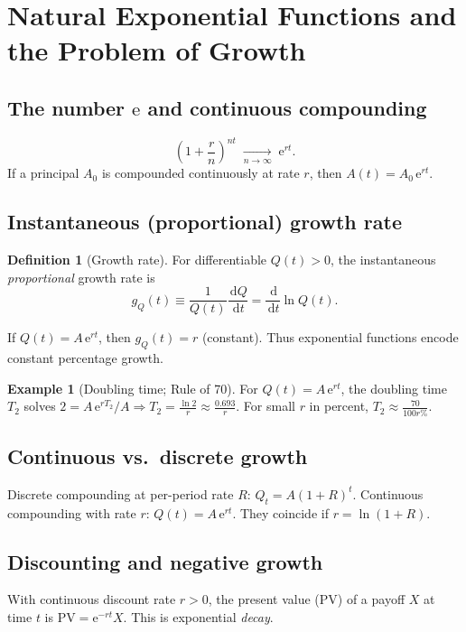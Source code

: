 \documentclass[12pt]{article}
\newcommand{\dd}{\,\mathrm{d}}
\newcommand{\e}{\mathrm{e}}
\newcommand{\1}{\mathbf{1}}
\theoremstyle{definition}
\newtheorem{definition}{Definition}
\newtheorem{example}{Example}
\theoremstyle{plain}
\begin{document}
\section{Natural Exponential Functions and the Problem of Growth}
\subsection*{The number \(\e\) and continuous compounding}
\[
\left(1+\frac{r}{n}\right)^{nt} \;\xrightarrow[n\to\infty]{}\; \e^{rt}.
\]
If a principal \(A_0\) is compounded continuously at rate \(r\), then \(A(t)=A_0\,\e^{rt}\).

\subsection*{Instantaneous (proportional) growth rate}
\begin{definition}[Growth rate]
For differentiable \(Q(t)>0\), the instantaneous \emph{proportional} growth rate is
\[
g_Q(t)\equiv\frac{1}{Q(t)}\frac{\dd Q}{\dd t}=\frac{\dd}{\dd t}\ln Q(t).
\]
\end{definition}
If \(Q(t)=A\,\e^{rt}\), then \(g_Q(t)=r\) (constant). Thus exponential functions encode constant percentage growth.

\begin{example}[Doubling time; Rule of 70]
For \(Q(t)=A\,\e^{rt}\), the doubling time \(T_2\) solves \(2=A\,\e^{rT_2}/A\Rightarrow T_2=\frac{\ln 2}{r}\approx\frac{0.693}{r}\). For small \(r\) in percent, \(T_2\approx\frac{70}{100r\%}\).
\end{example}

\subsection*{Continuous vs.\ discrete growth}
Discrete compounding at per-period rate \(R\): \(Q_t=A(1+R)^t\). Continuous compounding with rate \(r\): \(Q(t)=A\,\e^{rt}\). They coincide if \(r=\ln(1+R)\).

\subsection*{Discounting and negative growth}
With continuous discount rate \(r>0\), the present value (PV) of a payoff \(X\) at time \(t\) is \(\mathrm{PV}=\e^{-rt}X\). This is exponential \emph{decay}.
\end{document}

